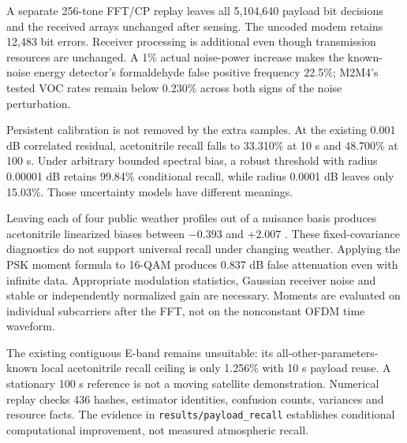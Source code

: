A separate 256-tone FFT/CP replay leaves all 5,104,640 payload bit decisions and the received arrays unchanged after sensing. The uncoded modem retains 12,483 bit errors. Receiver processing is additional even though transmission resources are unchanged. A 1\% actual noise-power increase makes the known-noise energy detector's formaldehyde false positive frequency 22.5\%; M2M4's tested VOC rates remain below 0.230\% across both signs of the noise perturbation.

Persistent calibration is not removed by the extra samples. At the existing 0.001 dB correlated residual, acetonitrile recall falls to 33.310\% at 10 s and 48.700\% at 100 s. Under arbitrary bounded spectral bias, a robust threshold with radius 0.00001 dB retains 99.84\% conditional recall, while radius 0.0001 dB leaves only 15.03\%. Those uncertainty models have different meanings.

Leaving each of four public weather profiles out of a nuisance basis produces acetonitrile linearized biases between $-0.393$ and $+2.007$ \ugm. These fixed-covariance diagnostics do not support universal recall under changing weather. Applying the PSK moment formula to 16-QAM produces 0.837 dB false attenuation even with infinite data. Appropriate modulation statistics, Gaussian receiver noise and stable or independently normalized gain are necessary. Moments are evaluated on individual subcarriers after the FFT, not on the nonconstant OFDM time waveform.

The existing contiguous E-band remains unsuitable: its all-other-parameters-known local acetonitrile recall ceiling is only 1.256\% with 10 s payload reuse. A stationary 100 s reference is not a moving satellite demonstration. Numerical replay checks 436 hashes, estimator identities, confusion counts, variances and resource facts. The evidence in \texttt{results/payload\_recall} establishes conditional computational improvement, not measured atmospheric recall.
